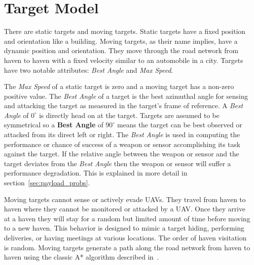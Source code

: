 \section{Target Model}

There are static targets and moving targets.  Static targets have a fixed position and orientation like a building.  Moving targets, as their name implies, have a dynamic position and orientation.  They move through the road network from haven to haven with a fixed velocity similar to an automobile in a city.  Targets have two notable attributes: \textit{Best Angle} and \textit{Max Speed}.

The \textit{Max Speed} of a static target is zero and a moving target has a non-zero positive value.  The \textit{Best Angle} of a target is the best azimuthal angle for sensing and attacking the target as measured in the target's frame of reference.  A \textit{Best Angle} of $0^{\circ}$ is directly head on at the target.  Targets are assumed to be symmetrical so a \textbf{Best Angle} of $90^{\circ}$ means the target can be best observed or attacked from its direct left or right.  The \textit{Best Angle} is used in computing the performance or chance of success of a weapon or sensor accomplishing its task against the target.  If the relative angle between the weapon or sensor and the target deviates from the \textit{Best Angle} then the weapon or sensor will suffer a performance degradation.  This is explained in more detail in section~\ref{sec:payload_probs}.

Moving targets cannot sense or actively evade UAVs.  They travel from haven to haven where they cannot be monitored or attacked by a UAV.  Once they arrive at a haven they will stay for a random but limited amount of time before moving to a new haven.  This behavior is designed to mimic a target hiding, performing deliveries, or having meetings at various locations.  The order of haven visitation is random.  Moving targets generate a path along the road network from haven to haven using the classic A* algorithm described in~\cite{wiki:astar}.

